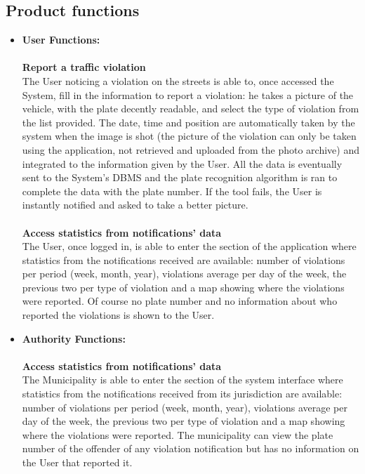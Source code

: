 \documentclass {article}
\begin{document}
	\subsection{Product functions} 
	\begin{itemize}
	\item {\bf User Functions:} \\ \\
		{\bf Report a traffic violation} \\
		The User noticing a violation on the streets is able to, once accessed the System, fill in the information to report a violation: he takes a picture of the vehicle, with the plate decently readable, and select the type of violation from the list provided. The date, time and position are automatically taken by the system when the image is shot (the picture of the violation can only be taken using the application, not retrieved and uploaded from the photo archive) and integrated to the information given by the User. All the data is eventually sent to the System’s DBMS and the plate recognition algorithm is ran to complete the data with the plate number. If the tool fails, the User is instantly notified and asked to take a better picture. \\ \\ 
		{\bf Access statistics from notifications’ data}\\
		The User, once logged in, is able to enter the section of the application where statistics from the notifications received are available: number of violations per period (week, month, year), violations average per day of the week, the previous two per type of violation and a map showing where the violations were reported. Of course no plate number and no information about who reported the violations is shown to the User.\\ 
	\item {\bf Authority Functions:} \\ \\
		{\bf Access statistics from notifications’ data}\\
		The Municipality is able to enter the section of the system interface where statistics from the notifications received from its jurisdiction are available: number of violations per period (week, month, year), violations average per day of the week, the previous two per type of violation and a map showing where the violations were reported. The municipality can view the plate number of the offender of any violation notification but has no information on the User that reported it. \\ \\

\end{itemize}
\end{document}
